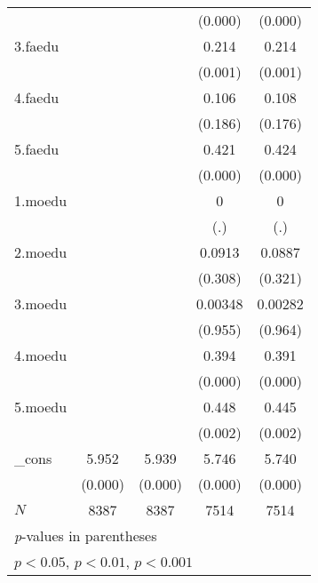 {\begin{tabular}{l*{4}{c}}
            &                     &                     &     (0.000)         &     (0.000)         \\
[1em]
3.faedu     &                     &                     &       0.214\sym{**} &       0.214\sym{**} \\
            &                     &                     &     (0.001)         &     (0.001)         \\
[1em]
4.faedu     &                     &                     &       0.106         &       0.108         \\
            &                     &                     &     (0.186)         &     (0.176)         \\
[1em]
5.faedu     &                     &                     &       0.421\sym{***}&       0.424\sym{***}\\
            &                     &                     &     (0.000)         &     (0.000)         \\
[1em]
1.moedu     &                     &                     &           0         &           0         \\
            &                     &                     &         (.)         &         (.)         \\
[1em]
2.moedu     &                     &                     &      0.0913         &      0.0887         \\
            &                     &                     &     (0.308)         &     (0.321)         \\
[1em]
3.moedu     &                     &                     &     0.00348         &     0.00282         \\
            &                     &                     &     (0.955)         &     (0.964)         \\
[1em]
4.moedu     &                     &                     &       0.394\sym{***}&       0.391\sym{***}\\
            &                     &                     &     (0.000)         &     (0.000)         \\
[1em]
5.moedu     &                     &                     &       0.448\sym{**} &       0.445\sym{**} \\
            &                     &                     &     (0.002)         &     (0.002)         \\
[1em]
\_cons      &       5.952\sym{***}&       5.939\sym{***}&       5.746\sym{***}&       5.740\sym{***}\\
            &     (0.000)         &     (0.000)         &     (0.000)         &     (0.000)         \\
\hline
\(N\)       &        8387         &        8387         &        7514         &        7514         \\
\hline\hline
\multicolumn{5}{l}{\footnotesize \textit{p}-values in parentheses}\\
\multicolumn{5}{l}{\footnotesize \sym{*} \(p<0.05\), \sym{**} \(p<0.01\), \sym{***} \(p<0.001\)}\\
\end{tabular}
}
